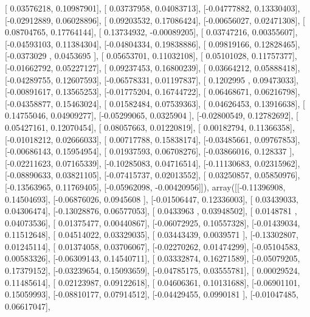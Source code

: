 \documentclass{article}
\begin{document}
       [ 0.03576218,  0.10987901],
       [ 0.03737958,  0.04083713],
       [-0.04777882,  0.13330403],
       [-0.02912889,  0.06028896],
       [ 0.09203532,  0.17086424],
       [-0.00656027,  0.02471308],
       [ 0.08704765,  0.17764144],
       [ 0.13734932, -0.00089205],
       [ 0.03747216,  0.00355607],
       [-0.04593103,  0.11384304],
       [-0.04804334,  0.19838886],
       [ 0.09819166,  0.12828465],
       [-0.0373029 ,  0.0453695 ],
       [ 0.05653701,  0.11032108],
       [ 0.05101028,  0.11757377],
       [-0.01662792,  0.05227127],
       [ 0.09237453,  0.16800239],
       [ 0.03664212,  0.05888418],
       [-0.04289755,  0.12607593],
       [-0.06578331,  0.01197837],
       [ 0.1202995 ,  0.09473033],
       [-0.00891617,  0.13565253],
       [-0.01775204,  0.16744722],
       [ 0.06468671,  0.06216798],
       [-0.04358877,  0.15463024],
       [ 0.01582484,  0.07539363],
       [ 0.04626453,  0.13916638],
       [ 0.14755046,  0.04909277],
       [-0.05299065,  0.0325904 ],
       [-0.02800549,  0.12782692],
       [ 0.05427161,  0.12070454],
       [ 0.08057663,  0.01220819],
       [ 0.00182794,  0.11366358],
       [-0.01018212,  0.02666033],
       [ 0.00717788,  0.15838174],
       [-0.03485661,  0.09767853],
       [-0.00686143,  0.15954954],
       [ 0.01937593,  0.06708276],
       [-0.03866016,  0.128337  ],
       [-0.02211623,  0.07165339],
       [-0.10285083,  0.04716514],
       [-0.11130683,  0.02315962],
       [-0.08890633,  0.03821105],
       [-0.07415737,  0.02013552],
       [ 0.03250857,  0.05850976],
       [-0.13563965,  0.11769405],
       [-0.05962098, -0.00420956]]), array([[-0.11396908,  0.14504693],
       [-0.06876026,  0.0945608 ],
       [-0.01506447,  0.12336003],
       [ 0.03439033,  0.04306474],
       [-0.13028876,  0.06577053],
       [ 0.0433963 ,  0.03948502],
       [ 0.0148781 ,  0.04073536],
       [ 0.01375477,  0.00440867],
       [-0.06072925,  0.10557328],
       [-0.01439034,  0.11512648],
       [ 0.04514022,  0.03329035],
       [ 0.03443439,  0.0039571 ],
       [-0.13302807,  0.01245114],
       [ 0.01374058,  0.03706067],
       [-0.02270262,  0.01474299],
       [-0.05104583,  0.00583326],
       [-0.06309143,  0.14540711],
       [ 0.03332874,  0.16271589],
       [-0.05079205,  0.17379152],
       [-0.03239654,  0.15093659],
       [-0.04785175,  0.03555781],
       [ 0.00029524,  0.11485614],
       [ 0.02123987,  0.09122618],
       [ 0.04606361,  0.10131688],
       [-0.06901101,  0.15059993],
       [-0.08810177,  0.07914512],
       [-0.04429455,  0.0990181 ],
       [-0.01047485,  0.06617047],
\end{document}
